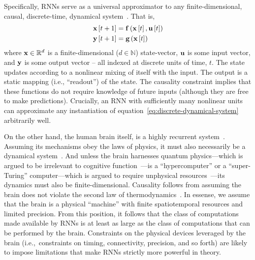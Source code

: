 Specifically, RNNs serve as a universal approximator to any finite-dimensional, causal, discrete-time, dynamical system~\citep{schafer2006recurrent}.
That is,
\begin{equation}
\begin{aligned} \label{eq:discrete-dynamical-system}
\mathbf{x}\left[ t + 1 \right] &= \mathbf{f}\left(\mathbf{x}\left[ t \right], \mathbf{u}\left[ t \right] \right) \\
\mathbf{y}\left[ t + 1 \right] &= \mathbf{g}\left(\mathbf{x}\left[ t \right] \right)
\end{aligned}
\end{equation}
where $\mathbf{x} \in \mathbb{R}^d$ is a finite-dimensional ($d \in \mathbb{N}$) state-vector, $\mathbf{u}$ is some input vector, and $\mathbf{y}$ is some output vector -- all indexed at discrete units of time, $t$.
The state updates according to a nonlinear mixing of itself with the input.
The output is a static mapping (i.e., ``readout'') of the state.
The causality constraint implies that these functions do not require knowledge of future inputs (although they are free to make predictions).
Crucially, an RNN with sufficiently many nonlinear units can approximate any instantiation of equation~\ref{eq:discrete-dynamical-system} arbitrarily well.

On the other hand, the human brain itself, is a highly recurrent system~\citep{dayan2001theoretical}.
Assuming its mechanisms obey the laws of physics, it must also necessarily be a dynamical system~\citep{amit1989modeling, mckenna1994brain, port1995mind}.
And unless the brain harnesses quantum physics---which is argued to be irrelevant to cognitive function~\citep{litt2006brain}---is a ``hypercomputer'' or a ``super-Turing'' computer---which is argued to require unphysical resources~\citep{broersma2018computability}---its dynamics must also be finite-dimensional.
Causality follows from assuming the brain does not violate the second law of thermodynamics~\citep{evans1996causality}.
In essense, we assume that the brain is a physical ``machine'' with finite spatiotemporal resources and limited precision.
From this position, it follows that the class of computations made available by RNNs is at least as large as the class of computations that can be performed by the brain.
Constraints on the physical devices leveraged by the brain (i.e.,~constraints on timing, connectivity, precision, and so forth) are likely to impose limitations that make RNNs strictly more powerful in theory.

